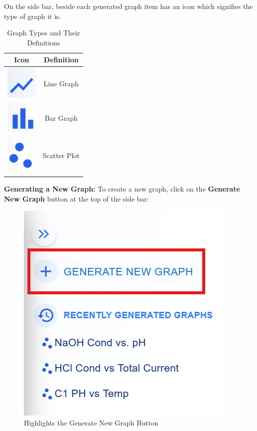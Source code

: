 \documentclass[12pt]{article}
\begin{document}
On the side bar, beside each generated graph item has an icon which signifies
the type of graph it is. 
\begin{table}[H]
    \centering
    \begin{tabular}{|c|c|}
        \hline
         \textbf{Icon} & \textbf{Definition} \\
        \hline
        \includegraphics[width=1.5cm]{./Diagrams/graph-line.png} & Line Graph \\
        \hline
        \includegraphics[width=1.5cm]{./Diagrams/graph-bar.png} & Bar Graph \\
        \hline
        \includegraphics[width=1.5cm]{./Diagrams/graph-scatter.png} & Scatter Plot \\
        \hline
    \end{tabular}
    \caption{Graph Types and Their Definitions}
    \label{tab:graphs}
\end{table}

\noindent \textbf{Generating a New Graph:} \newline
To create a new graph, click on the \textbf{Generate New Graph} button at the top of the side bar:
\begin{figure}[H]
    \centering
    \includegraphics[scale=1]{./Diagrams/graph-newgraph .png}
    \caption{Highlights the Generate New Graph Button}
    \label{fig:newgraph}
\end{figure}
\end{document}
